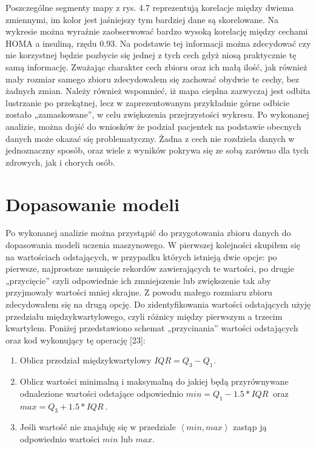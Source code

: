 \documentclass[a4paper,12pt,oneside]{book}
\begin{document}
Poszczególne segmenty mapy z rys. 4.7 reprezentują korelacje między dwiema zmiennymi, im kolor jest jaśniejszy tym bardziej dane są skorelowane. Na wykresie można wyraźnie zaobserwować bardzo wysoką korelację między cechami HOMA a insuliną, rzędu 0.93. Na podstawie tej informacji można zdecydować czy nie korzystnej będzie pozbycie się jednej z tych cech gdyż niosą praktycznie tę samą informację. Zważając charakter cech zbioru oraz ich małą ilość, jak również mały rozmiar samego zbioru zdecydowałem się zachować obydwie te cechy, bez żadnych zmian. Należy również wspomnieć, iż mapa cieplna zazwyczaj jest odbita lustrzanie po przekątnej, lecz w zaprezentowanym przykładnie górne odbicie zostało „zamaskowane”, w celu zwiększenia przejrzystości wykresu. Po wykonanej analizie, można dojść do wniosków że podział pacjentek na podstawie obecnych danych może okazać się problematyczny. Żadna z cech nie rozdziela danych w jednoznaczny sposób, oraz wiele z wyników pokrywa się ze sobą zarówno dla tych zdrowych, jak i chorych osób.

\section{Dopasowanie modeli}

Po wykonanej analizie można przystąpić do przygotowania zbioru danych do dopasowania modeli uczenia maszynowego. W pierwszej kolejności skupiłem się na wartościach odstających, w przypadku których istnieją dwie opcje: po pierwsze, najprostsze usunięcie rekordów zawierających te wartości, po drugie „przycięcie” czyli odpowiednie ich zmniejszenie lub zwiększenie tak aby przyjmowały wartości mniej skrajne. Z powodu małego rozmiaru zbioru zdecydowałem się na drugą opcję. Do zidentyfikowania wartości odstających użyję przedziału międzykwartylowego, czyli różnicy między pierwszym a trzecim kwartylem. Poniżej przedstawiono schemat „przycinania” wartości odstających oraz kod wykonujący tę operację [23]:

\begin{enumerate}
    \item Oblicz przedział międzykwartylowy \textit{ }$IQR=Q_3-Q_1$\textit{.}
    \item Oblicz wartości minimalną i maksymalną do jakiej będą przyrównywane odnalezione wartości odstające odpowiednio ${min =Q_1-1.5*IQR\ }$ oraz ${max =Q_3+1.5*IQR\ }$.
    \item Jeśli wartość nie znajduję się w przedziale $\left\langle min,max\right\rangle $ zastąp ją odpowiednio wartości $min$ lub $max$.
\end{enumerate}
\end{document}
